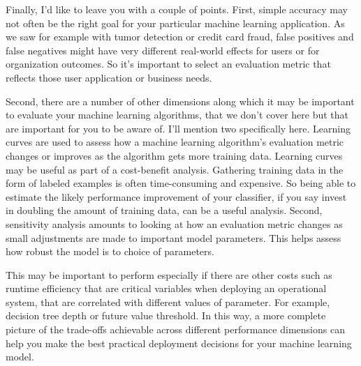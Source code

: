 \begin{multicols}{2}
Finally, I'd like to leave you with a couple of points. First, simple accuracy may not often be the right goal for your particular machine learning application. As we saw for example with tumor detection or credit card fraud, false positives and false negatives might have very different real-world effects for users or for organization outcomes. So it's important to select an evaluation metric that reflects those user application or business needs. 

Second, there are a number of other dimensions along which it may be important to evaluate your machine learning algorithms, that we don't cover here but that are important for you to be aware of. I'll mention two specifically here. Learning curves are used to assess how a machine learning algorithm's evaluation metric changes or improves as the algorithm gets more training data. Learning curves may be useful as part of a cost-benefit analysis. Gathering training data in the form of labeled examples is often time-consuming and expensive. So being able to estimate the likely performance improvement of your classifier, if you say invest in doubling the amount of training data, can be a useful analysis. Second, sensitivity analysis amounts to looking at how an evaluation metric changes as small adjustments are made to important model parameters. This helps assess how robust the model is to choice of parameters. 

This may be important to perform especially if there are other costs such as runtime efficiency that are critical variables when deploying an operational system, that are correlated with different values of parameter. For example, decision tree depth or future value threshold. In this way, a more complete picture of the trade-offs achievable across different performance dimensions can help you make the best practical deployment decisions for your machine learning model. 

\end{multicols}
